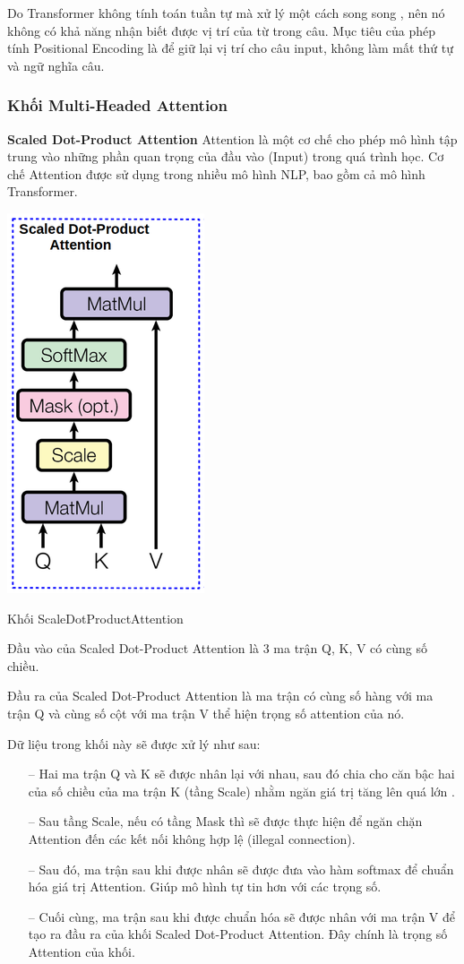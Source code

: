\documentclass[a4paper, 12pt, openany]{book}
\begin{document}
Do Transformer không tính toán tuần tự mà xử lý một cách song song , nên nó không có khả năng
nhận biết được vị trí của từ trong câu. Mục tiêu của phép tính
Positional Encoding là để giữ lại vị trí cho câu input, không làm mất thứ tự và ngữ nghĩa câu.

\subsubsection{Khối Multi-Headed Attention}
\textbf{Scaled Dot-Product Attention}
Attention là một cơ chế cho phép mô hình tập trung vào những phần quan trọng của đầu vào (Input) trong quá trình học.
Cơ chế Attention được sử dụng trong nhiều mô hình NLP, bao gồm cả mô hình Transformer.

\begin{minipage}{\linewidth}
    \captionsetup{type=figure}
    \centering
    \includegraphics[width=.2\linewidth]{./assets/images/ScaledDotProductAttention.png}
    \caption{Khối ScaleDotProductAttention\cite{vaswani2023attention}}
\end{minipage}

Đầu vào của Scaled Dot-Product Attention là 3 ma trận Q, K, V có cùng số chiều.

Đầu ra của Scaled Dot-Product Attention là ma trận có cùng số hàng với ma trận Q và cùng số cột với ma trận V thể hiện trọng số attention của nó.

Dữ liệu trong khối này sẽ được xử lý như sau: \begin{itemize}
    \item[--] Hai ma trận Q và K sẽ được nhân lại với nhau, sau đó chia cho căn bậc hai của số chiều
        của ma trận K (tầng Scale) nhằm ngăn giá trị tăng lên quá lớn .
    \item[--] Sau tầng Scale, nếu có tầng Mask thì sẽ được thực hiện để ngăn chặn Attention đến các kết nối không
        hợp lệ (illegal connection).
    \item[--] Sau đó, ma trận sau khi được nhân sẽ được đưa vào hàm softmax để chuẩn hóa giá trị Attention. Giúp mô hình tự tin hơn với các trọng số.
    \item[--] Cuối cùng, ma trận sau khi được chuẩn hóa sẽ được nhân với ma trận V để tạo ra đầu ra của khối Scaled Dot-Product Attention. Đây chính là trọng số Attention của khối.
\end{itemize}
\end{document}
